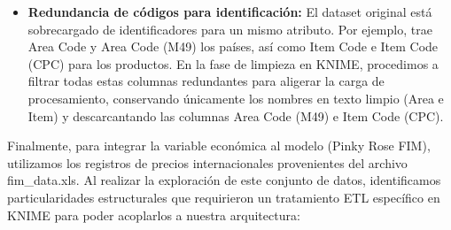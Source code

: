 \begin{itemize}
	\item \textbf{Redundancia de códigos para identificación:} El dataset original está sobrecargado de identificadores para un mismo atributo. Por ejemplo, trae Area Code y Area Code (M49) los países, así como Item Code e Item Code (CPC) para los productos. En la fase de limpieza en KNIME, procedimos a filtrar todas estas columnas redundantes para aligerar la carga de procesamiento, conservando únicamente los nombres en texto limpio (Area e Item) y descarcantando las columnas Area Code (M49) e Item Code (CPC).
\end{itemize}
Finalmente, para integrar la variable económica al modelo (Pinky Rose FIM), utilizamos los registros de precios internacionales provenientes del archivo fim\_data.xls. Al realizar la exploración de este conjunto de datos, identificamos particularidades estructurales que requirieron un tratamiento ETL específico en KNIME para poder acoplarlos a nuestra arquitectura: 
